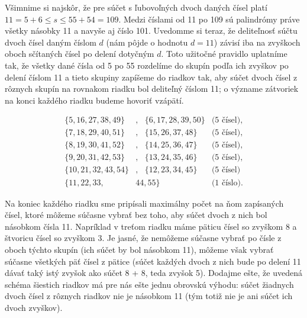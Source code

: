 Všimnime si najskôr, že pre súčet s ľubovoľných dvoch daných čísel platí $11 = 5 + 6 \leq  s \leq 55 + 54 = 109$. Medzi číslami od 11 po 109 sú palindrómy práve všetky násobky 11 a navyše aj číslo 101. Uvedomme si teraz, že deliteľnosť súčtu dvoch čísel daným číslom $d$ (nám pôjde o hodnotu $d = 11$) závisí iba na zvyškoch oboch sčítaných čísel po delení dotyčným $d$. Toto užitočné pravidlo uplatníme tak, že všetky dané čísla
od 5 po 55 rozdelíme do skupín podľa ich zvyškov po delení číslom 11 a tieto skupiny zapíšeme do riadkov tak, aby súčet dvoch čísel z rôznych skupín na rovnakom riadku bol deliteľný číslom 11; o význame zátvoriek na konci každého riadku budeme hovoriť vzápätí.
\begin{center}
\begin{align*}
\{5, 16, 27, 38, 49\}&, \ \ \ \{6, 17, 28, 39, 50\} &\text{(5 čísel)},\\
\{7, 18, 29, 40, 51\}&, \ \ \ \{15, 26, 37, 48\}  &\text{(5 čísel)},\\
\{8, 19, 30, 41, 52\}&, \ \ \ \{14, 25, 36, 47\} &\text{(5 čísel)},\\
\{9, 20, 31, 42, 53\}&, \ \ \ \{13, 24, 35, 46\}  &\text{(5 čísel)},\\
\{10, 21, 32, 43, 54\}&, \ \ \ \{12, 23, 34, 45\} &\text{(5 čísel)}\\
\{11, 22, 33,& 44, 55\} \ \ &\text{(1 číslo)}.
\end{align*}
\end{center}

Na koniec každého riadku sme pripísali maximálny počet na ňom zapísaných čísel, ktoré môžeme súčasne vybrať bez toho, aby súčet dvoch z nich bol násobkom čísla 11. Napríklad v treťom riadku máme päticu čísel so zvyškom 8 a štvoricu čísel so zvyškom 3. Je jasné, že nemôžeme súčasne vybrať po čísle z oboch týchto skupín (ich súčet by bol násobkom 11), môžeme však vybrať súčasne všetkých päť čísel z pätice (súčet každých dvoch z nich bude po delení 11 dávať taký istý zvyšok ako súčet 8 + 8, teda zvyšok 5). Dodajme ešte, že uvedená schéma šiestich riadkov má pre nás ešte jednu obrovskú výhodu: súčet žiadnych dvoch čísel z rôznych riadkov nie je násobkom 11 (tým totiž nie
je ani súčet ich dvoch zvyškov).


